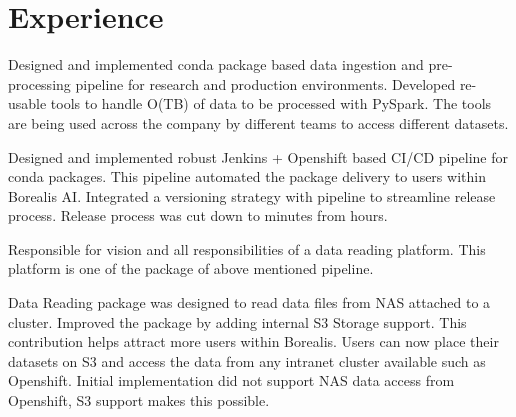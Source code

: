 \documentclass[]{deedy-resume-openfont}
\begin{document}
\begin{minipage}[t]{0.63\textwidth} 


\section{Experience}

\vspace{\topsep} %
\begin{tightemize}

\item Designed and implemented conda package based data ingestion and pre-processing pipeline for research and production environments. Developed re-usable tools to handle O(TB) of data to be processed with PySpark. The tools are being used across the company by different teams to access different datasets. 


\item Designed and implemented robust Jenkins + Openshift based CI/CD pipeline for conda packages. This pipeline automated the package delivery to users within Borealis AI. Integrated a versioning strategy with pipeline to streamline release process. Release process was cut down to minutes from hours. 

\item Responsible for vision and all responsibilities of a data reading platform. This platform is one of the package of above mentioned pipeline. 

\item Data Reading package was designed to read data files from NAS attached to a cluster. Improved the package by adding internal S3 Storage support. This contribution helps attract more users within Borealis. Users can now place their datasets on S3 and access the data from any intranet cluster available such as Openshift. Initial implementation did not support NAS data access from Openshift, S3 support makes this possible. 

\end{tightemize}
\sectionsep

\vspace{\topsep} %
\begin{tightemize}


\end{tightemize}
\end{minipage}
\end{document}

